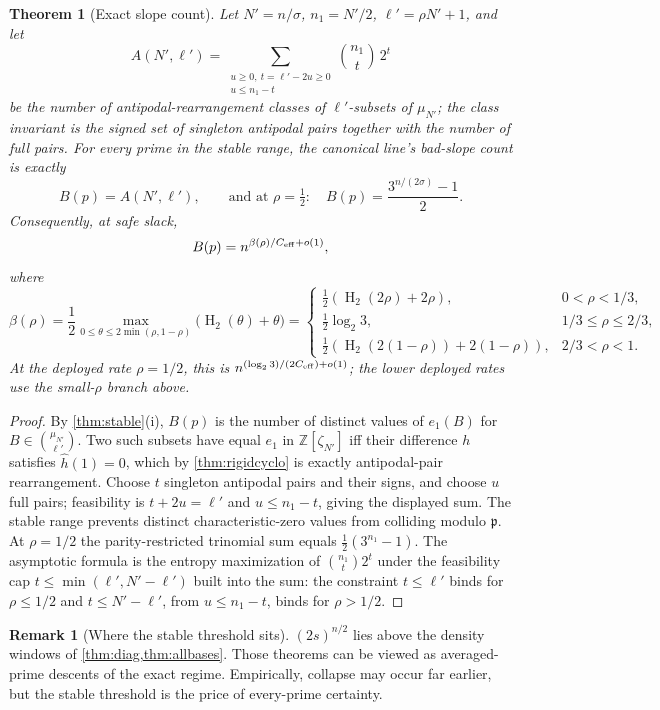 \documentclass[11pt]{article}
\newtheorem{theorem}{Theorem}[section]
\theoremstyle{definition}
\newtheorem{remark}[remark]{Remark}
\newcommand{\Z}{\mathbb Z}
\newcommand{\HH}{\operatorname{H}_2}
\newcommand{\ceff}{C_{\rm eff}}
\begin{document}
\begin{theorem}[Exact slope count]\label{thm:exactcount}
Let $N'=n/\sigma$, $n_1=N'/2$, $\ell'=\rho N'+1$, and let
\[
        A(N',\ell')=\sum_{\substack{u\ge0,\ t=\ell'-2u\ge0\\ u\le n_1-t}}\binom{n_1}{t}\,2^t
\]
be the number of antipodal-rearrangement classes of $\ell'$-subsets of $\mu_{N'}$; the class invariant is the signed set of singleton antipodal pairs together with the number of full pairs.  For every prime in the stable range, the canonical line's bad-slope count is exactly
\[
        B(p)=A(N',\ell'),
        \qquad\text{and at }\rho=\tfrac12:\quad
        B(p)=\frac{3^{n/(2\sigma)}-1}{2}.
\]
Consequently, at safe slack,
\[
        B(p)=n^{\beta(\rho)/\ceff+o(1)},
\]
where
\[
        \beta(\rho)=\frac12\max_{0\le\theta\le2\min(\rho,1-\rho)}\big(\HH(\theta)+\theta\big)
        =\begin{cases}
        \frac12(\HH(2\rho)+2\rho), & 0<\rho<1/3,\\[1mm]
        \frac12\log_2 3, & 1/3\le\rho\le2/3,\\[1mm]
        \frac12(\HH(2(1-\rho))+2(1-\rho)), & 2/3<\rho<1.
        \end{cases}
\]
At the deployed rate $\rho=1/2$, this is $n^{(\log_2 3)/(2\ceff)+o(1)}$; the lower deployed rates use the small-$\rho$ branch above.
\end{theorem}

\begin{proof}
By \cref{thm:stable}(i), $B(p)$ is the number of distinct values of $e_1(B)$ for $B\in\binom{\mu_{N'}}{\ell'}$.  Two such subsets have equal $e_1$ in $\Z[\zeta_{N'}]$ iff their difference $h$ satisfies $\widehat h(1)=0$, which by \cref{thm:rigidcyclo} is exactly antipodal-pair rearrangement.  Choose $t$ singleton antipodal pairs and their signs, and choose $u$ full pairs; feasibility is $t+2u=\ell'$ and $u\le n_1-t$, giving the displayed sum.  The stable range prevents distinct characteristic-zero values from colliding modulo $\mathfrak p$.  At $\rho=1/2$ the parity-restricted trinomial sum equals $\frac12(3^{n_1}-1)$.  The asymptotic formula is the entropy maximization of $\binom{n_1}{t}2^t$ under the feasibility cap $t\le\min(\ell',N'-\ell')$ built into the sum: the constraint $t\le\ell'$ binds for $\rho\le1/2$ and $t\le N'-\ell'$, from $u\le n_1-t$, binds for $\rho>1/2$.
\end{proof}

\begin{remark}[Where the stable threshold sits]\label{rem:threshold}
$(2s)^{n/2}$ lies above the density windows of \cref{thm:diag,thm:allbases}.  Those theorems can be viewed as averaged-prime descents of the exact regime.  Empirically, collapse may occur far earlier, but the stable threshold is the price of every-prime certainty.
\end{remark}
\end{document}
